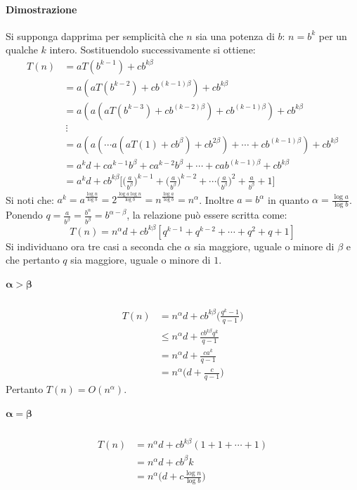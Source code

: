\paragraph{Dimostrazione}\mbox{}
Si supponga dapprima per semplicit\`a che $n$ sia una potenza di $b$: $n = b^k$ per un qualche $k$ intero. Sostituendolo successivamente si ottiene: 
\begin{align*}
	T(n) &= aT(b^{k-1}) + cb^{k\beta} \\
	     &= a(aT(b^{k-2}) + cb^{(k-1)\beta}) + cb^{k\beta}\\
	     &= a(a(aT(b^{k-3}) + cb^{(k-2)\beta}) + cb^{(k-1)\beta}) + cb^{k\beta}\\
	     &\ \vdots \\
	     &= a(a(\cdots a(aT(1) + cb^{\beta}) + cb^{2\beta})+\cdots+cb^{(k-1)\beta})+cb^{k\beta}\\
	     &= a^kd + ca^{k-1}b^\beta + ca^{k-2}b^\beta + \cdots + cab^{(k-1)\beta} + cb^{k\beta}\\
	     &= a^kd + cb^{k\beta}\biggl[\biggl(\frac{a}{b^\beta}\biggr)^{k-1} + \biggl(\frac{a}{b^\beta}\biggr)^{k-2} + \cdots \biggl(\frac{a}{b^\beta}\biggr)^{2} + \frac{a}{b^\beta} + 1
	     	\biggr]
\end{align*}
Si noti che: $a^k = a^{\frac{\log n}{\log b}}= 2^{\frac{\log a \log n}{\log b}} = n^{\frac{\log a}{\log b}} = n^\alpha$. Inoltre $a = b^\alpha$ in quanto $\alpha = \frac{\log a}{\log b}$.
Ponendo $q = \frac{a}{b^\beta} = \frac{b^\alpha}{b^\beta} = b^{\alpha - \beta}$, la relazione pu\`o essere scritta come: 
$$ T(n) = n^\alpha d + cb^{k\beta}[q^{k-1} + q^{k-2} + \cdots + q^2 + q + 1]$$
Si individuano ora tre casi a seconda che $\alpha$ sia maggiore, uguale o minore di $\beta$ e che pertanto $q$ sia maggiore, uguale o minore di $1$. 
\subparagraph{$\mathbf{\alpha > \beta}$}
\begin{align*}
	T(n) &= n^\alpha d + cb^{k\beta}\biggl(\frac{q^k - 1}{q -1}\biggr)\\
	     &\le n^\alpha d + \frac{cb^{k\beta}q^k}{q-1}\\
	     &= n^\alpha d + \frac{ca^k}{q-1}\\
	     &=  n^\alpha\biggl(d + \frac{c}{q-1}\biggr)
\end{align*}
Pertanto $T(n) = O(n^\alpha)$.
\subparagraph{$\mathbf{\alpha = \beta}$}
\begin{align*}
	T(n) &= n^\alpha d + cb^{k\beta}(1+1+\cdots+1)\\
	     &= n^\alpha d +cb^\beta k\\
	     &= n^\alpha\biggl(d+c\frac{\log n}{\log b}\biggr)
\end{align*}

